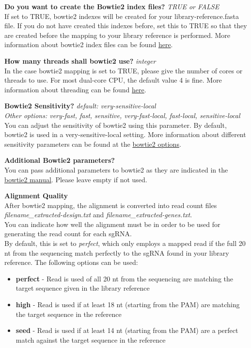 \documentclass[]{article}
\providecommand{\tightlist}{%
  \setlength{\itemsep}{0pt}\setlength{\parskip}{0pt}}
\begin{document}
\textbf{Do you want to create the Bowtie2 index files?} \emph{TRUE or
FALSE}\\
If set to TRUE, bowtie2 indexes will be created for your
library-reference.fasta file. If you do not have created this indexes
before, set this to TRUE so that they are created before the mapping to
your library reference is performed. More information about bowtie2
index files can be found
\href{http://bowtie-bio.sourceforge.net/bowtie2/manual.shtml\#the-bowtie2-build-indexer}{here}.

\textbf{How many threads shall bowtie2 use?} \emph{integer}\\
In the case bowtie2 mapping is set to TRUE, please give the number of
cores or threads to use. For most dual-core CPU, the default value 4 is
fine. More information about threading can be found
\href{http://bowtie-bio.sourceforge.net/bowtie2/manual.shtml\#performance-tuning}{here}.

\textbf{Bowtie2 Sensitivity?} \emph{default: very-sensitive-local}\\
\emph{Other options: very-fast, fast, sensitive, very-fast-local,
fast-local, sensitive-local}\\
You can adjust the sensitivity of bowtie2 using this parameter. By
default, bowtie2 is used in a very-sensitive-local setting. More
information about different sensitivity parameters can be found at the
\href{http://bowtie-bio.sourceforge.net/bowtie2/manual.shtml\#options}{bowtie2
options}.

\textbf{Additional Bowtie2 parameters?}\\
You can pass additional parameters to bowtie2 as they are indicated in
the
\href{http://bowtie-bio.sourceforge.net/bowtie2/manual.shtml}{bowtie2
manual}. Please leave empty if not used.

\textbf{Alignment Quality}\\
After bowtie2 mapping, the alignment is converted into read count files
\emph{filename\_extracted-design.txt} and
\emph{filename\_extracted-genes.txt}.\\
You can indicate how well the alignment must be in order to be used for
generating the read count for each sgRNA.\\
By default, this is set to \emph{perfect}, which only employs a mapped
read if the full 20 nt from the sequencing match perfectly to the sgRNA
found in your library reference. The following options can be used:

\begin{itemize}
\tightlist
\item
  \textbf{perfect} - Read is used of all 20 nt from the sequencing are
  matching the target sequence given in the library reference
\item
  \textbf{high} - Read is used if at least 18 nt (starting from the PAM)
  are matching the target sequence in the reference
\item
  \textbf{seed} - Read is used if at least 14 nt (starting from the PAM)
  are a perfect match against the target sequence in the reference
\end{itemize}
\end{document}
